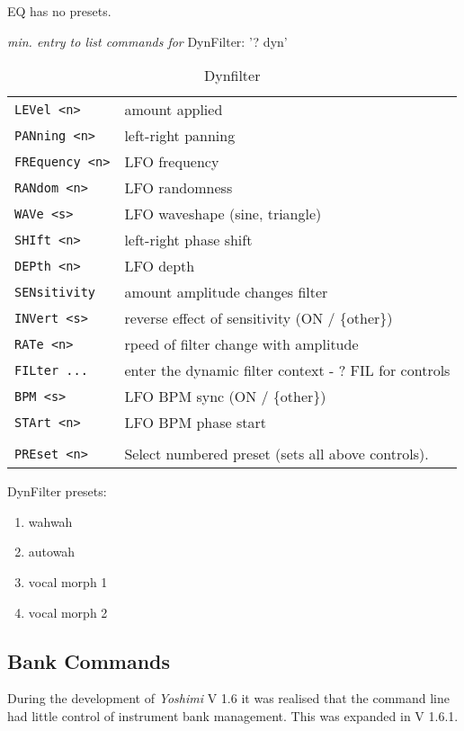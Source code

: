 EQ has no presets.

   \textsl{min. entry to list commands for} DynFilter:  '? dyn'
   \begin{table}[H]
      \centering
      \caption{Dynfilter}
      \begin{tabular}{l l}
\texttt{LEVel <n>} &
   amount applied \\
\texttt{PANning <n>} &
   left-right panning \\
\texttt{FREquency <n>} &
   LFO frequency \\
\texttt{RANdom <n>} &
   LFO randomness \\
\texttt{WAVe <s>} &
   LFO waveshape (sine, triangle) \\
\texttt{SHIft <n>} &
   left-right phase shift \\
\texttt{DEPth <n>} &
   LFO depth \\
\texttt{SENsitivity} &
   amount amplitude changes filter \\
\texttt{INVert <s>} &
   reverse effect of sensitivity (ON / \{other\}) \\
\texttt{RATe <n>} &
   rpeed of filter change with amplitude \\
\texttt{FILter ...} &
   enter the dynamic filter context - ? FIL for controls\\
\texttt{BPM <s>} &
   LFO BPM sync (ON / \{other\}) \\
\texttt{STArt <n>} &
   LFO BPM phase start \\
\texttt{} & \\ %
\texttt{PREset <n>} &
   Select numbered preset (sets all above controls). \\
      \end{tabular}
   \end{table}
DynFilter presets:
   \begin{enumerate}
   \item wahwah
   \item autowah
   \item vocal morph 1
   \item vocal morph 2
   \end{enumerate}

\subsection{Bank Commands}
\label{subsec:command_line_bank_command_list}

   During the development of \textsl{Yoshimi} V 1.6 it was realised that
   the command line had little control of instrument bank management.
   This was expanded in V 1.6.1.


